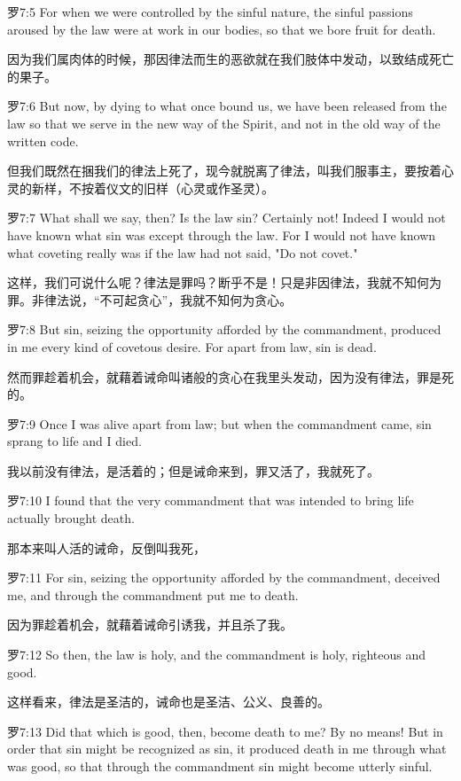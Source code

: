 \documentclass[a4paper,11pt,onecolumn,twoside]{ctexart}
\begin{document}
\begin{multicols}{2}
 罗7:5
 For when we were controlled by the sinful nature, the sinful passions aroused by the law were at work in our bodies, so that we bore fruit for death.

 因为我们属肉体的时候，那因律法而生的恶欲就在我们肢体中发动，以致结成死亡的果子。


 罗7:6
 But now, by dying to what once bound us, we have been released from the law so that we serve in the new way of the Spirit, and not in the old way of the written code.

 但我们既然在捆我们的律法上死了，现今就脱离了律法，叫我们服事主，要按着心灵的新样，不按着仪文的旧样（心灵或作圣灵）。


 罗7:7
 What shall we say, then? Is the law sin? Certainly not! Indeed I would not have known what sin was except through the law. For I would not have known what coveting really was if the law had not said, "Do not covet."

 这样，我们可说什么呢？律法是罪吗？断乎不是！只是非因律法，我就不知何为罪。非律法说，“不可起贪心”，我就不知何为贪心。


 罗7:8
 But sin, seizing the opportunity afforded by the commandment, produced in me every kind of covetous desire. For apart from law, sin is dead.

 然而罪趁着机会，就藉着诫命叫诸般的贪心在我里头发动，因为没有律法，罪是死的。


 罗7:9
 Once I was alive apart from law; but when the commandment came, sin sprang to life and I died.

 我以前没有律法，是活着的；但是诫命来到，罪又活了，我就死了。


 罗7:10
 I found that the very commandment that was intended to bring life actually brought death.

 那本来叫人活的诫命，反倒叫我死，


 罗7:11
 For sin, seizing the opportunity afforded by the commandment, deceived me, and through the commandment put me to death.

 因为罪趁着机会，就藉着诫命引诱我，并且杀了我。


 罗7:12
 So then, the law is holy, and the commandment is holy, righteous and good.

 这样看来，律法是圣洁的，诫命也是圣洁、公义、良善的。


 罗7:13
 Did that which is good, then, become death to me? By no means! But in order that sin might be recognized as sin, it produced death in me through what was good, so that through the commandment sin might become utterly sinful.


\end{multicols}
\end{document}
